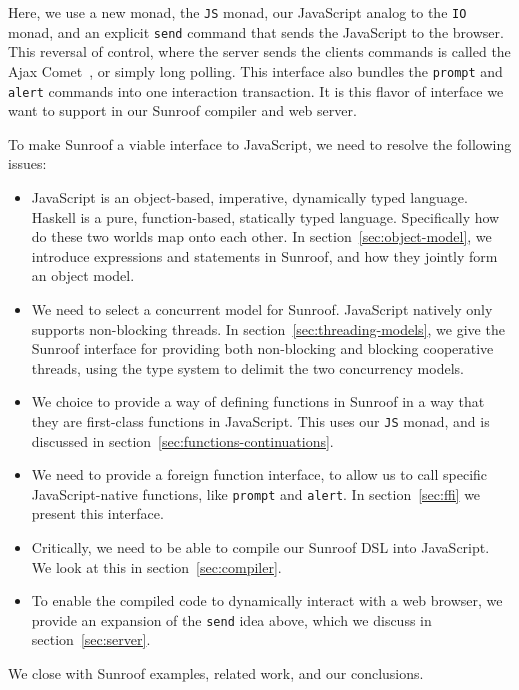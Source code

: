 \documentclass{llncs}
\newcommand{\Src}[1]{{\tt{#1}}}
\begin{document}
Here, we use a new monad, the \Src{JS} monad, our JavaScript
analog to the \Src{IO} monad,
and an explicit \Src{send} command that sends the JavaScript to the browser.
This reversal of control, where the
server sends the clients commands is called the Ajax Comet~\cite{..},
or simply long polling.
This interface also bundles the \Src{prompt} and \Src{alert} commands
into one interaction transaction.
It is this flavor of interface we want to support in our Sunroof compiler
and web server.  

To make Sunroof a viable interface to JavaScript, we need to
resolve the following issues:
\begin{itemize}
\item JavaScript is an object-based, imperative, dynamically typed language.
Haskell is a pure, function-based, statically typed language.
Specifically how do these two worlds map onto each other.
In section~\ref{sec:object-model}, we introduce expressions and statements
in Sunroof, and how they jointly form an object model.
%
\item We need to select a concurrent model for Sunroof.
JavaScript natively only supports non-blocking threads.
In section~\ref{sec:threading-models}, we give the
Sunroof interface for providing both non-blocking and blocking cooperative threads,
using the type system to delimit the two concurrency models.
%
\item We choice to provide a way of defining functions
in Sunroof in a way that they are first-class functions
in JavaScript. This uses our \Src{JS} monad, and
is discussed in section~\ref{sec:functions-continuations}.
%
\item We need to provide a foreign function interface,
to allow us to call specific JavaScript-native functions,
like \Src{prompt} and \Src{alert}.
In section~\ref{sec:ffi} we present this interface.
%
\item Critically, we need to be able to compile our Sunroof DSL
into JavaScript. We look at this in section~\ref{sec:compiler}.
\item To enable the compiled code to dynamically interact with
a web browser, we provide an expansion of the \Src{send} idea above,
which we discuss in section~\ref{sec:server}.
\end{itemize}

We close with Sunroof examples, related work, and our conclusions.

\end{document}
